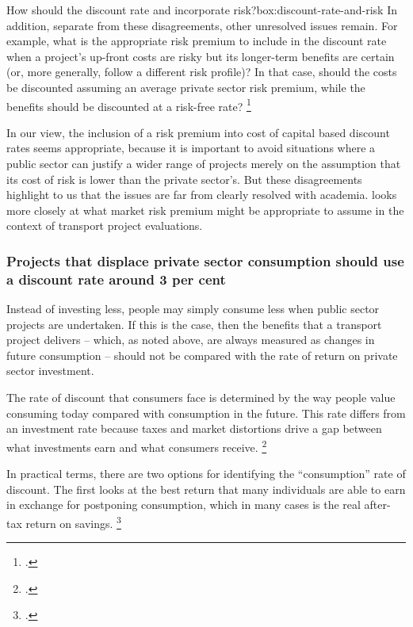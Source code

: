 \begin{bigbox}{How should the discount rate and incorporate risk?}{box:discount-rate-and-risk}
In addition, separate from these disagreements, other unresolved issues remain. For example, what is the appropriate risk premium to include in the discount rate when a project's up-front costs are risky but its longer-term benefits are certain (or, more generally, follow a different risk profile)? In that case, should the costs be discounted assuming an average private sector risk premium, while the benefits should be discounted at a risk-free rate?%
	\footcite[][26]{Grimes-Beyond-Simple-CBA}

In our view, the inclusion of a risk premium into cost of capital based discount rates seems appropriate, because it is important to avoid situations where a public sector can justify a wider range of projects merely on the assumption that its cost of risk is lower than the private sector's. But these disagreements highlight to us that the issues are far from clearly resolved with academia.  looks more closely at what market risk premium might be appropriate to assume in the context of transport project evaluations. 

\end{bigbox}


\subsubsection{Projects that displace private sector consumption should use a discount rate around 3 per cent}

Instead of investing less, people may simply consume less when public sector projects are undertaken. If this is the case, then the benefits that a transport project delivers -- which, as noted above, are always measured as changes in future consumption -- should not be compared with the rate of return on private sector investment. 

The rate of discount that consumers face is determined by the way people value consuming today compared with consumption in the future. This rate differs from an investment rate because taxes and market distortions drive a gap between what investments earn and what consumers receive.%
    \footcite[][26]{Harrison-Valuing-the-Future}

In practical terms, there are two options for identifying the ``consumption'' rate of discount. The first looks at the best return that many individuals are able to earn in exchange for postponing consumption, which in many cases is the real after-tax return on savings.%
    \footcites[][239]{Boardman-Cost-Benefit-Analysis-4th-Edition}[][xii]{Harrison-Valuing-the-Future}

